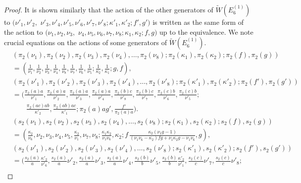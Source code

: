 \documentclass[10pt,a4paper]{amsart}
\begin{document}
\begin{proof}
It is shown similarly that the action of the other generators of $\widetilde{W}(E^{(1)}_{6})$ to $(\nu '_1 , \nu '_2 ,$ $ \nu '_3 , \nu '_4 ,\nu '_5 ,\nu '_6 , \nu '_7 ,\nu '_8 ; \kappa '_1 ,\kappa '_2 ; f' ,g' ) $ is written as the same form of the action to $(\nu _1 , \nu _2 , \nu _3 ,$ $ \nu _4 ,\nu _5 ,\nu _6 , \nu _7 ,\nu _8 ; \kappa _1 ,\kappa _2 ; f ,g ) $ up to the equivalence.
We note crucial equations on the actions of some generators of $\widetilde{W}(E^{(1)}_{6})$.
\begin{align}
& (\pi _2 ( \nu _1) , \pi _2 (\nu _2) , \pi _2 ( \nu _3) , \pi _2 ( \nu _4) , \dots , \pi _2 (\nu _8) ;  \pi _2 (\kappa _1) , \pi _2 (\kappa _2) ;  \pi _2 (f ) , \pi _2 (g) ) \\
& = (\frac{1}{\nu_1}, \frac{1}{\nu_2}, \frac{1}{\nu_3}, \frac{1}{\nu_4}, \frac{1}{\nu_8} , \frac{1}{\nu_7}, \frac{1}{\nu_6}, \frac{1}{\nu_5} ; \frac{1}{\kappa_2} , \frac{1}{\kappa_1}  ; g , f ),  \nonumber \\
& (\pi _2 ( \nu '_1) , \pi _2 (\nu '_2) , \pi _2 ( \nu '_3) , \pi _2 ( \nu '_4) , \dots , \pi _2 (\nu '_8) ;  \pi _2 (\kappa '_1) , \pi _2 (\kappa '_2) ;  \pi _2 (f' ) , \pi _2 (g') ) \nonumber \\
& =  (\frac{\pi _2 ( a ) a }{\nu ' _1}, \frac{\pi _2 ( a ) a }{\nu  '_2}, \frac{\pi _2 ( a ) a }{\nu  '_3}, \frac{\pi _2 ( a ) a }{\nu  '_4}, \frac{\pi _2 ( b ) c }{\nu  '_8} , \frac{\pi _2 ( b ) c }{\nu  '_7}, \frac{\pi _2 ( c ) b }{\nu  '_6}, \frac{\pi _2 ( c ) b }{\nu  '_5} ; \nonumber \\
& \qquad   \frac{\pi _2 ( a c ) a b }{\kappa  '_2} , \frac{\pi _2 ( a b ) a c }{\kappa  '_1 } ; \pi _2 ( a ) a g ' ,  \frac{f ' }{\pi _2 ( a ) a}) . \nonumber
\end{align} 
\begin{align}
& (s _2 ( \nu _1) , s _2 (\nu _2) , s _2 ( \nu _3) , s _2 ( \nu _4) , \dots , s _2 (\nu _8) ;  s _2 (\kappa _1) , s _2 (\kappa _2) ;  s _2 (f ) , s _2 (g) ) \\
& =  (\frac{\kappa_2 }{\nu_6 }, \nu_2 , \nu_3 , \nu_4 ,\nu_5 ,\frac{\kappa_2 }{\nu_1} , \nu_7 ,\nu_8 ; \frac{\kappa_1 \kappa_2 }{\nu_1 \nu_6} ,\kappa_2 ;  f\, \frac{\kappa_2 ( \nu_1 g-1)  }{ (\nu _1 \nu_6 - \kappa_2  )fg + \nu _1 \kappa_2 g - \nu _1 \nu_6 } ,g ) , \nonumber \\
& (s _2 ( \nu '_1) , s _2 (\nu '_2) , s _2 ( \nu '_3) , s _2 ( \nu '_4) , \dots , s _2 (\nu '_8) ;  s _2 (\kappa '_1) , s _2 (\kappa '_2) ; s _2 (f' ) , s _2 (g') ) \nonumber \\
& =  (\frac{s _2 (a)}{a} \frac{\kappa '_2 }{\nu '_6} , \frac{s _2 (a)}{a} \nu '_2 , \frac{s _2 (a)}{a} \nu '_3 , \frac{s _2 (a)}{a} \nu '_4 , \frac{s _2 (b)}{b} \nu '_5 , \frac{s _2 (b)}{b} \frac{\kappa '_2 }{\nu '_1} , \frac{s _2 (c)}{c} \nu '_7 , \frac{s _2 (c)}{c} \nu '_8 ; \nonumber \\

\end{align}
\end{proof}
\end{document}
